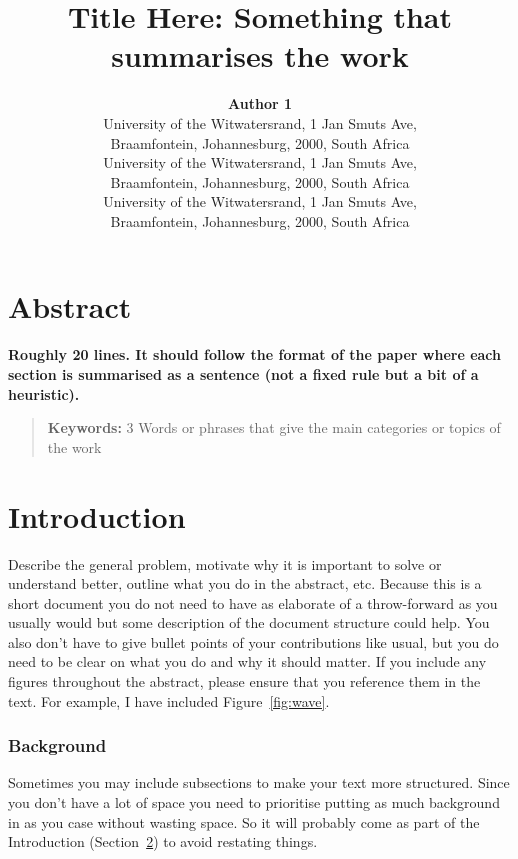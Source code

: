 \documentclass[10pt,letterpaper]{article}
\title{Title Here: Something that summarises the work}
\author{{\large \bf Author 1 } \\ University of the Witwatersrand, 1 Jan Smuts Ave,\\ Braamfontein, Johannesburg, 2000, South Africa
  \AND {\large \bf Author 2 } \\ University of the Witwatersrand, 1 Jan Smuts Ave,\\ Braamfontein, Johannesburg, 2000, South Africa
  \AND {\large \bf Author 3} \\ University of the Witwatersrand, 1 Jan Smuts Ave,\\ Braamfontein, Johannesburg, 2000, South Africa}
\begin{document}
\maketitle
\phantom{.}
\newpage
\phantom{.}
\newpage
\section{Abstract}
{
\bf
{}
Roughly 20 lines. It should follow the format of the paper where each section is summarised as a sentence (not a fixed rule but a bit of a heuristic).
}
\begin{quote}
\small
\textbf{Keywords:} 
3 Words or phrases that give the main categories or topics of the work
\end{quote}

\section{Introduction} \label{Intro}
Describe the general problem, motivate why it is important to solve or understand better, outline what you do in the abstract, etc. Because this is a short document you do not need to have as elaborate of a throw-forward as you usually would but some description of the document structure could help. You also don't have to give bullet points of your contributions like usual, but you do need to be clear on what you do and why it should matter. If you include any figures throughout the abstract, please ensure that you reference them in the text. For example, I have included Figure~\ref{fig:wave}.

\subsubsection{Background}
Sometimes you may include subsections to make your text more structured. Since you don't have a lot of space you need to prioritise putting as much background in as you case without wasting space. So it will probably come as part of the Introduction (Section~\ref{Intro}) to avoid restating things.
\end{document}
